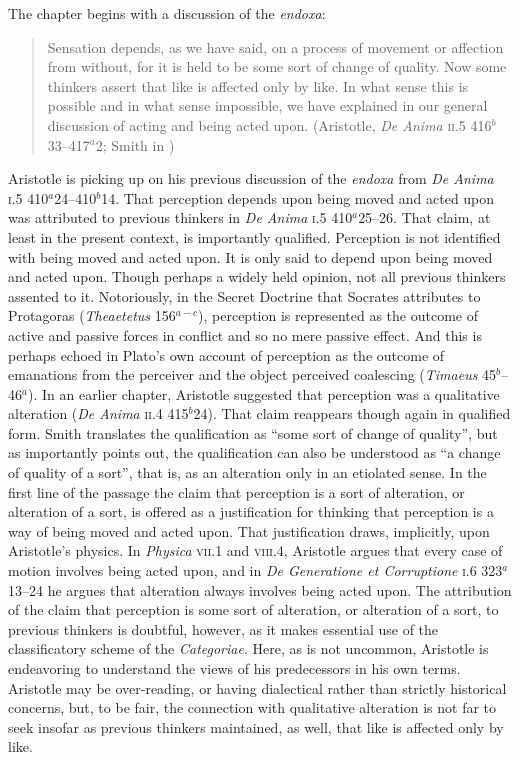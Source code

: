 The chapter begins with a discussion of the \emph{endoxa}:
\begin{quote}
	Sensation depends, as we have said, on a process of movement or affection from without, for it is held to be some sort of change of quality. Now some thinkers assert that like is affected only by like. In what sense this is possible and in what sense impossible, we have explained in our general discussion of acting and being acted upon. (Aristotle, \emph{De Anima} \textsc{ii}.5 416\( ^{b} \)33--417\( ^{a} \)2; Smith in \citealt[29]{Barnes:1984uq})
\end{quote}
Aristotle is picking up on his previous discussion of the \emph{endoxa} from \emph{De Anima} \textsc{i}.5 410\( ^{a} \)24--410\( ^{b} \)14. That perception depends upon being moved and acted upon was attributed to previous thinkers in \emph{De Anima} \textsc{i}.5 410\( ^{a} \)25--26. That claim, at least in the present context, is importantly qualified. Perception is not identified with being moved and acted upon. It is only said to depend upon being moved and acted upon. Though perhaps a widely held opinion, not all previous thinkers assented to it. Notoriously, in the Secret Doctrine that Socrates attributes to Protagoras (\emph{Theaetetus} 156\( ^{a-c} \)), perception is represented as the outcome of active and passive forces in conflict and so no mere passive effect. And this is perhaps echoed in Plato's own account of perception as the outcome of emanations from the perceiver and the object perceived coalescing (\emph{Timaeus} 45\( ^{b} \)--46\( ^{a} \)). In an earlier chapter, Aristotle suggested that perception was a qualitative alteration (\emph{De Anima} \textsc{ii}.4 415\( ^{b} \)24). That claim reappears though again in qualified form. Smith translates the qualification as ``some sort of change of quality'', but as \citet[36--37]{Burnyeat:2002an} importantly points out, the qualification can also be understood as ``a change of quality of a sort'', that is, as an alteration only in an etiolated sense. In the first line of the passage the claim that perception is a sort of alteration, or alteration of a sort, is offered as a justification for thinking that perception is a way of being moved and acted upon. That justification draws, implicitly, upon Aristotle's physics. In \emph{Physica} \textsc{vii}.1 and \textsc{viii}.4, Aristotle argues that every case of motion involves being acted upon, and in \emph{De Generatione et Corruptione} \textsc{i}.6 323\( ^{a} \)13--24 he argues that alteration always involves being acted upon. The attribution of the claim that perception is some sort of alteration, or alteration of a sort, to previous thinkers is doubtful, however, as it makes essential use of the classificatory scheme of the \emph{Categoriae}. Here, as is not uncommon, Aristotle is endeavoring to understand the views of his predecessors in his own terms. Aristotle may be over-reading, or having dialectical rather than strictly historical concerns, but, to be fair, the connection with qualitative alteration is not far to seek insofar as previous thinkers maintained, as well, that like is affected only by like.

